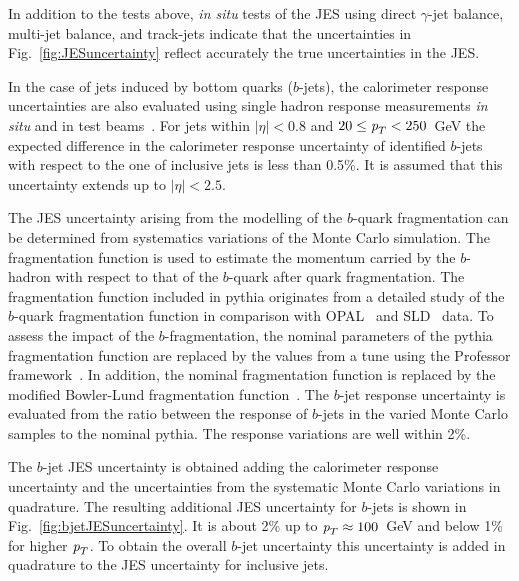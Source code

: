 In addition to the tests above, \emph{in situ} tests of the JES using direct $\gamma$-jet balance, multi-jet balance, and track-jets indicate that the uncertainties in Fig.~\ref{fig:JESuncertainty} reflect accurately the true uncertainties in the JES.  

In the case of jets induced by bottom quarks ($b$-jets), the calorimeter response uncertainties are also evaluated using single hadron response measurements \emph{in situ}  and in test beams~\cite{ATLAS-CONF-2011-028}. For jets within $|\eta|<0.8$ and $20 \leq {\emph{p}_{T}} < 250$~GeV the expected difference in the calorimeter response uncertainty of identified $b$-jets with respect to the one of inclusive jets is less than 0.5\%. It is assumed that this uncertainty extends up to $|\eta| < 2.5$.

The JES uncertainty arising from the modelling of the $b$-quark fragmentation can be determined from systematics variations of the Monte Carlo simulation. The fragmentation function is used to estimate the momentum carried by the $b$-hadron with respect to that of the $b$-quark after quark fragmentation.   The fragmentation function included in {\sc pythia} originates from a detailed study of the $b$-quark fragmentation function in comparison with OPAL~\cite{Abbiendi:2002vt} and SLD~\cite{Abe:2002iq} data. To assess the impact of the $b$-fragmentation, the nominal parameters of the {\sc pythia} fragmentation function are replaced by the values from a tune using the Professor framework~\cite{Professor}. In addition, the nominal fragmentation function is replaced by the modified Bowler-Lund fragmentation function~\cite{BowlerLund}. The $b$-jet response uncertainty is evaluated from the ratio between the response of $b$-jets in the varied Monte Carlo samples to the nominal {\sc pythia}. The response variations are well within 2\%.

The $b$-jet JES uncertainty is obtained adding the calorimeter response uncertainty and the uncertainties from the systematic Monte Carlo variations in quadrature. The resulting additional JES uncertainty for $b$-jets is shown in Fig.~\ref{fig:bjetJESuncertainty}. It is about 2\% up to ${\emph{p}_{T}} \approx 100$~GeV and below 1\% for higher ${\emph{p}_{T}}$. To obtain the overall $b$-jet uncertainty this uncertainty is added in quadrature to the JES uncertainty for inclusive jets.

